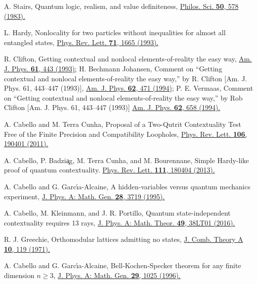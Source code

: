 \documentclass[%
 twocolumn,
 groupedaddress,
 showpacs,
 showkeys,
 preprintnumbers,
 amsmath,amssymb,
 aps,
 pra,
 longbibliography,
 floatfix,
 ]{revtex4-1}
\begin{document}
\begin{thebibliography}{99}
A. Stairs,
Quantum logic, realism, and value definiteness,
\href{https://doi.org/10.1086/289140}{Philos. Sci. {\bf 50}, 578 (1983).}

L. Hardy,
Nonlocality for two particles without inequalities for almost all entangled states,
\href{https://doi.org/10.1103/PhysRevLett.71.1665}{Phys. Rev. Lett. \textbf{71}, 1665 (1993).}

R. Clifton,
Getting contextual and nonlocal elements‐of‐reality the easy way,
\href{https://doi.org/10.1119/1.17239}{Am. J. Phys. \textbf{61}, 443 (1993);}
H. Bechmann Johansen,
Comment on ``Getting contextual and nonlocal elements‐of‐reality the easy way,'' by R. Clifton [Am. J. Phys. 61, 443--447 (1993)],
\href{https://doi.org/10.1119/1.17551}{Am. J. Phys. \textbf{62}, 471 (1994);}
P. E. Vermaas,
Comment on ``Getting contextual and nonlocal elements‐of‐reality the easy way,'' by Rob Clifton [Am. J. Phys. 61, 443--447 (1993)]
\href{https://doi.org/10.1119/1.17488}{Am. J. Phys. \textbf{62}, 658 (1994).}

A. Cabello and M. Terra Cunha,
Proposal of a Two-Qutrit Contextuality Test Free of the Finite Precision and Compatibility Loopholes,
\href{http://dx.doi.org/10.1103/PhysRevLett.106.190401}{Phys. Rev. Lett. \textbf{106}, 190401 (2011).}

A. Cabello, P. Badzi{\c a}g, M. Terra Cunha, and M. Bourennane,
Simple Hardy-like proof of quantum contextuality.
\href{http://dx.doi.org/10.1103/PhysRevLett.111.180404 }{Phys. Rev. Lett. \textbf{111}, 180404 (2013).}

A. Cabello and G. Garc\'{\i}a-Alcaine,
A hidden-variables versus quantum mechanics experiment,
\href{https://doi.org/10.1088/0305-4470/28/13/016}{J. Phys. A: Math. Gen. \textbf{28}, 3719 (1995).}

A. Cabello, M. Kleinmann, and J. R. Portillo,
Quantum state-independent contextuality requires 13 rays,
\href{http://dx.doi.org/10.1088/1751-8113/49/38/38LT01}{J. Phys. A: Math. Theor. \textbf{49}, 38LT01 (2016).}

R. J. Greechie,
Orthomodular lattices admitting no states,
\href{https://doi.org/10.1016/0097-3165(71)90015-X}{J. Comb. Theory A \textbf{10}, 119 (1971).}


A. Cabello and G. Garc\'{\i}a-Alcaine,
Bell-Kochen-Specker theorem for any finite dimension $n \ge 3$,
\href{http://dx.doi.org/10.1088/0305-4470/29/5/016}{J. Phys. A: Math. Gen. \textbf{29}, 1025 (1996).}
	

\end{thebibliography}
\end{document}
